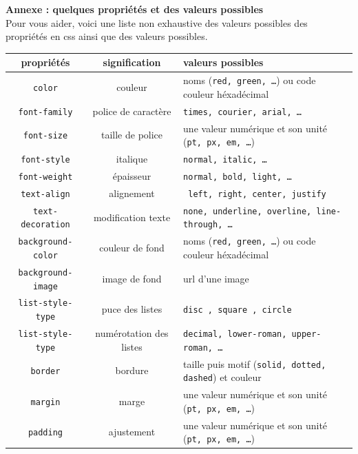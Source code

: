 \documentclass[11pt,a4paper]{article}
\begin{document}
\item \textbf{Annexe : quelques propriétés et des valeurs possibles} \\
Pour vous aider, voici une liste non exhaustive des valeurs possibles des propriétés en css ainsi que des valeurs possibles.\\
\renewcommand{\arraystretch}{1.5}
\begin{tabularx}{0.94\textwidth}{|c|c|X|}
	\hline
	\textbf{propriétés}       & \textbf{signification}  & \textbf{valeurs possibles}                                     \\
	\hline
	\texttt{color}            & couleur                 & noms (\texttt{red, green, \dots}) ou  code couleur héxadécimal \\
	\hline
	\texttt{font-family}      & police de caractère     & \texttt{times, courier, arial, \dots}                          \\
	\hline
	\texttt{font-size}        & taille de police        & une valeur numérique et son unité (\texttt{pt, px, em, \dots}) \\
	\hline
	\texttt{font-style}       & italique                & \texttt{normal, italic,  \dots}                                \\
	\hline
	\texttt{font-weight}      & épaisseur               & \texttt{normal, bold, light, \dots}                            \\
	\hline
	\texttt{text-align}       & alignement              & \texttt{ left, right, center, justify}                         \\
	\hline
	\texttt{text-decoration}  & modification texte      & \texttt{none, underline, overline, line-through, \dots}        \\
	\hline
	\texttt{background-color} & couleur de fond         & noms (\texttt{red, green, \dots}) ou  code couleur héxadécimal \\
	\hline
	\texttt{background-image} & image de fond           & url d'une image                                                \\
	\hline
	\texttt{list-style-type}  & puce des listes         & \texttt{disc , square , circle }                               \\
	\hline
	\texttt{list-style-type}  & numérotation des listes & \texttt{decimal, lower-roman, upper-roman, \dots}              \\
	\hline
	\texttt{border}           & bordure                 & taille puis motif (\texttt{solid, dotted, dashed}) et couleur  \\
	\hline
	\texttt{margin}           & marge                   & une valeur numérique et son unité (\texttt{pt, px, em, \dots}) \\
	\hline
	\texttt{padding}          & ajustement              & une valeur numérique et son unité (\texttt{pt, px, em, \dots}) \\
	\hline
\end{tabularx} \\
\end{document}
